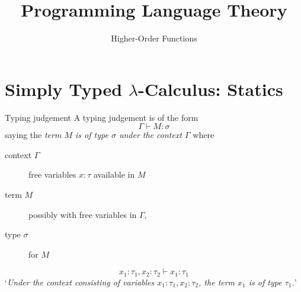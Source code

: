 
\title{Programming Language Theory}
\subtitle{Higher-Order Functions}


{
\begin{frame}\maketitle\end{frame}}

\section{Simply Typed $\lambda$-Calculus: Statics}

\begin{frame}{Typing judgement}
  A \alert{typing judgement} is of the form
  \[
    \Gamma \vdash M : \sigma
  \]
  saying the \emph{term $M$ is of type $\sigma$ under the context $\Gamma$}
  where 
  \begin{description}
    \item[context $\Gamma$] free variables $x : \tau$ available in $M$
    \item[term $M$] possibly with free variables in $\Gamma$,
    \item[type $\sigma$] for $M$
  \end{description}

  \[
    x_1:\tau_1, x_2: \tau_2 \vdash x_1 : \tau_1
  \]
  `\emph{Under the context consisting of variables $x_1:\tau_1, x_2:\tau_2$, the term $x_1$ is of type $\tau_1$.}'
\end{frame}


